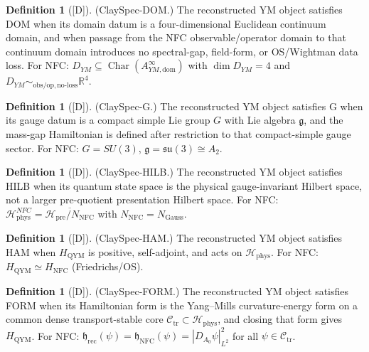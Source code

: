 \documentclass[12pt,oneside]{amsbook}
\theoremstyle{plain}
\theoremstyle{definition}
\newtheorem{definition}[theorem]{Definition}
\theoremstyle{remark}
\newcommand{\status}[1]{\textup{[#1]}}
\begin{document}
\begin{definition}[\status{D}]\label{def:ClaySpec-DOM-predicate}
\textup{(ClaySpec-DOM.)}
The reconstructed YM object satisfies DOM when its domain datum is a
four-dimensional Euclidean continuum domain, and when passage from the
NFC observable/operator domain to that continuum domain introduces no
spectral-gap, field-form, or OS/Wightman data loss.
For NFC: $D_{YM}\subseteq\operatorname{Char}(A^\infty_{YM,\mathrm{dom}})$
with $\dim D_{YM}=4$ and
$D_{YM}\sim_{\mathrm{obs/op,no\text{-}loss}}\mathbb{R}^4$.
\end{definition}

\begin{definition}[\status{D}]\label{def:ClaySpec-G-predicate}
\textup{(ClaySpec-G.)}
The reconstructed YM object satisfies G when its gauge datum is a
compact simple Lie group $G$ with Lie algebra $\mathfrak{g}$, and the
mass-gap Hamiltonian is defined after restriction to that
compact-simple gauge sector.
For NFC: $G=SU(3)$, $\mathfrak{g}=\mathfrak{su}(3)\cong A_2$.
\end{definition}

\begin{definition}[\status{D}]\label{def:ClaySpec-HILB-predicate}
\textup{(ClaySpec-HILB.)}
The reconstructed YM object satisfies HILB when its quantum state
space is the physical gauge-invariant Hilbert space, not a larger
pre-quotient presentation Hilbert space.
For NFC:
$\mathcal{H}^{NFC}_{\mathrm{phys}} = \overline{\mathcal{H}_{\mathrm{pre}}/N_{\mathrm{NFC}}}$
with $N_{\mathrm{NFC}} = N_{\mathrm{Gauss}}$.
\end{definition}

\begin{definition}[\status{D}]\label{def:ClaySpec-HAM-predicate}
\textup{(ClaySpec-HAM.)}
The reconstructed YM object satisfies HAM when $H_{\mathrm{QYM}}$ is
positive, self-adjoint, and acts on $\mathcal{H}_{\mathrm{phys}}$.
For NFC: $H_{\mathrm{QYM}}\simeq H_{\mathrm{NFC}}$ (Friedrichs/OS).
\end{definition}

\begin{definition}[\status{D}]\label{def:ClaySpec-FORM-predicate}
\textup{(ClaySpec-FORM.)}
The reconstructed YM object satisfies FORM when its Hamiltonian form
is the Yang--Mills curvature-energy form on a common dense
transport-stable core $\mathcal{C}_{\mathrm{tr}}\subset
\mathcal{H}_{\mathrm{phys}}$, and closing that form gives $H_{\mathrm{QYM}}$.
For NFC: $\mathfrak{h}_{\mathrm{rec}}(\psi)=
\mathfrak{h}_{\mathrm{NFC}}(\psi)=|D_{A_0}\psi|^2_{L^2}$ for all
$\psi\in\mathcal{C}_{\mathrm{tr}}$.
\end{definition}
\end{document}
